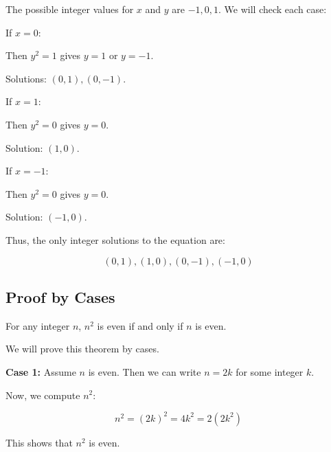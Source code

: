 The possible integer values for \( x \) and \( y \) are \( -1, 0, 1 \). We will check each case:
\vspace{\baselineskip}

If \( x = 0 \):
\vspace{\baselineskip}

Then \( y^2 = 1 \) gives \( y = 1 \) or \( y = -1 \).
\vspace{\baselineskip}

Solutions: \( (0, 1), (0, -1) \).
\vspace{\baselineskip}

If \( x = 1 \):
\vspace{\baselineskip}

Then \( y^2 = 0 \) gives \( y = 0 \).
\vspace{\baselineskip}

Solution: \( (1, 0) \).
\vspace{\baselineskip}

If \( x = -1 \):
\vspace{\baselineskip}

Then \( y^2 = 0 \) gives \( y = 0 \).
\vspace{\baselineskip}

Solution: \( (-1, 0) \).
\vspace{\baselineskip}

Thus, the only integer solutions to the equation are:
	
\[
	(0, 1), (1, 0), (0, -1), (-1, 0)
\]

\QED

\subsection{Proof by Cases}

For any integer \( n \), \( n^2 \) is even if and only if \( n \) is even.
\vspace{\baselineskip}

We will prove this theorem by cases.
\vspace{\baselineskip}

\textbf{Case 1:} Assume \( n \) is even. Then we can write \( n = 2k \) for some integer \( k \).
\vspace{\baselineskip}

Now, we compute \( n^2 \):

\[
	n^2 = {(2k)}^2 = 4k^2 = 2(2k^2)
\]

This shows that \( n^2 \) is even.
\vspace{\baselineskip}


